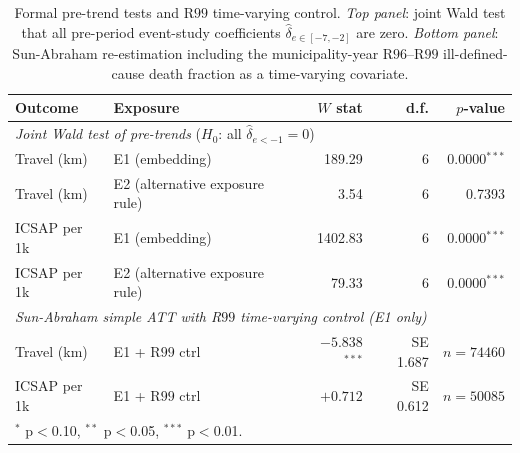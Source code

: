 \begin{table}[h!]
\centering
\caption{Formal pre-trend tests and R$99$ time-varying control. \emph{Top panel}: joint Wald test that all pre-period event-study coefficients $\hat{\delta}_{e \in [-7, -2]}$ are zero. \emph{Bottom panel}: Sun-Abraham re-estimation including the municipality-year R$96$--R$99$ ill-defined-cause death fraction as a time-varying covariate.}
\label{tab:pretrend-r99}
\small
\begin{tabular}{llrrr}
\toprule
Outcome & Exposure & $W$ stat & d.f. & $p$-value \\
\midrule
\multicolumn{5}{l}{\textit{Joint Wald test of pre-trends} ($H_0$: all $\hat{\delta}_{e<-1} = 0$)} \\
Travel (km) & E1 (embedding) & 189.29 & 6 & 0.0000$^{***}$ \\
Travel (km) & E2 (alternative exposure rule) & 3.54 & 6 & 0.7393 \\
ICSAP per 1k & E1 (embedding) & 1402.83 & 6 & 0.0000$^{***}$ \\
ICSAP per 1k & E2 (alternative exposure rule) & 79.33 & 6 & 0.0000$^{***}$ \\
\midrule
\multicolumn{5}{l}{\textit{Sun-Abraham simple ATT with R$99$ time-varying control (E1 only)}} \\
Travel (km) & E1 + R$99$ ctrl & $-5.838$$^{***}$ & SE 1.687 & $n = 74460$ \\
ICSAP per 1k & E1 + R$99$ ctrl & $+0.712$ & SE 0.612 & $n = 50085$ \\
\bottomrule
\multicolumn{5}{l}{\footnotesize $^{*}$ p$<$0.10, $^{**}$ p$<$0.05, $^{***}$ p$<$0.01.} \\
\end{tabular}
\end{table}
